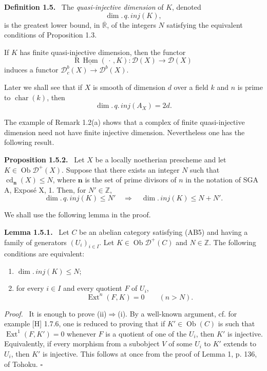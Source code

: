 \documentclass[11pt]{article}
\theoremstyle{plain}
\theoremstyle{definition}
\theoremstyle{remark}
\newenvironment{statement}[1]{\par\medskip\noindent\textbf{#1.}\ }{\par\medskip}
\newenvironment{prooftext}{\par\noindent\textit{Proof.}\ }{\par\medskip}
\newcommand{\RR}{\mathbb R}
\newcommand{\ZZ}{\mathbb Z}
\newcommand{\D}{\mathcal D}\newcommand{\E}{\mathcal E}\newcommand{\F}{\mathcal F}
\DeclareMathOperator{\Hom}{Hom}
\DeclareMathOperator{\Ext}{Ext}
\DeclareMathOperator{\ob}{Ob}
\DeclareMathOperator{\cd}{cd}
\newcommand{\R}{\mathrm R}
\newcommand{\qedtext}{\hfill$\square$}
\begin{document}
\begin{statement}{Definition 1.5}
The \emph{quasi-injective dimension} of $K$, denoted
\[
   \dim.\,q.\,inj(K),
\]
is the greatest lower bound, in $\overline{\RR}$, of the integers $N$ satisfying the equivalent conditions of Proposition 1.3.
\end{statement}

If $K$ has finite quasi-injective dimension, then the functor
\[
   \R\,\underline{\Hom}(\,\cdot\,,K):\D(X)\longrightarrow\D(X)
\]
induces a functor $\D_c^b(X)\to\D^b(X)$.

Later we shall see that if $X$ is smooth of dimension $d$ over a field $k$ and $n$ is prime to $\operatorname{char}(k)$, then
\[
   \dim.\,q.\,inj(A_X)=2d.
\]

The example of Remark 1.2(a) shows that a complex of finite quasi-injective dimension need not have finite injective dimension. Nevertheless one has the following result.

\begin{statement}{Proposition 1.5.2}
Let $X$ be a locally noetherian prescheme and let $K\in\ob\D^+(X)$. Suppose that there exists an integer $N$ such that $\cd_{\mathbf n}(X)\le N$, where $\mathbf n$ is the set of prime divisors of $n$ in the notation of SGA A, Exposé X, 1. Then, for $N'\in\ZZ$,
\[
   \dim.\,q.\,inj(K)\le N'\quad\Longrightarrow\quad \dim.\,inj(K)\le N+N'.
\]
\end{statement}

We shall use the following lemma in the proof.

\begin{statement}{Lemma 1.5.1}
Let $C$ be an abelian category satisfying (AB5) and having a family of generators $(U_i)_{i\in I}$. Let $K\in\ob\D^+(C)$ and $N\in\ZZ$. The following conditions are equivalent:
\begin{enumerate}[label=(\roman*)]
\item $\dim.\,inj(K)\le N$;
\item for every $i\in I$ and every quotient $F$ of $U_i$,
\[
   \Ext^n(F,K)=0\qquad(n>N).
\]
\end{enumerate}
\end{statement}

\begin{prooftext}
It is enough to prove (ii)$\Rightarrow$(i). By a well-known argument, cf. for example [H] 1.7.6, one is reduced to proving that if $K'\in\ob(C)$ is such that $\Ext^1(F,K')=0$ whenever $F$ is a quotient of one of the $U_i$, then $K'$ is injective. Equivalently, if every morphism from a subobject $V$ of some $U_i$ to $K'$ extends to $U_i$, then $K'$ is injective. This follows at once from the proof of Lemma 1, p. 136, of Tohoku. \qedtext
\end{prooftext}
\end{document}
